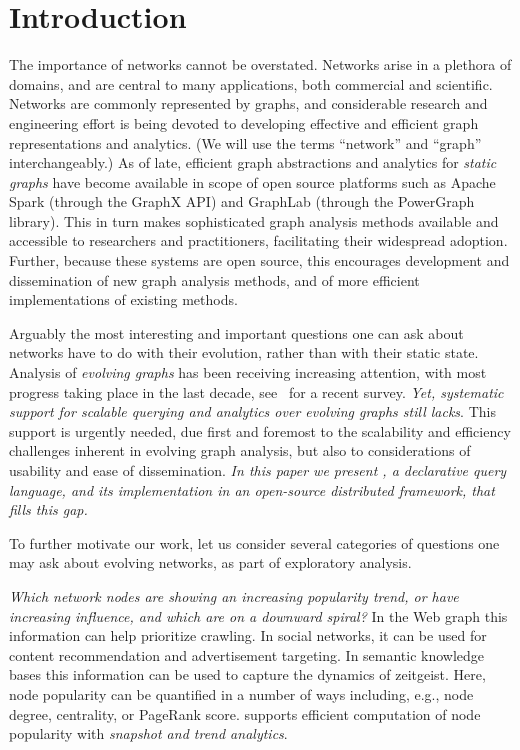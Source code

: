 \section{Introduction}
\label{sec:intro}

The importance of networks cannot be overstated. Networks arise in a
plethora of domains, and are central to many applications, both
commercial and scientific.  Networks are commonly represented by
graphs, and considerable research and engineering effort is being
devoted to developing effective and efficient graph representations
and analytics. (We will use the terms ``network'' and ``graph''
interchangeably.) As of late, efficient graph abstractions and
analytics for {\em static graphs} have become available in scope of
open source platforms such as Apache Spark (through the GraphX API)
and GraphLab (through the PowerGraph library).  This in turn makes
sophisticated graph analysis methods available and accessible to
researchers and practitioners, facilitating their widespread adoption.
Further, because these systems are open source, this encourages
development and dissemination of new graph analysis methods, and of
more efficient implementations of existing methods.

Arguably the most interesting and important questions one can ask
about networks have to do with their evolution, rather than with their
static state.  Analysis of {\em evolving graphs} has been receiving
increasing attention, with most progress taking place in the last
decade, see~\cite{DBLP:journals/csur/AggarwalS14} for a recent survey.
{\em Yet, systematic support for scalable querying and analytics over
  evolving graphs still lacks}.  This support is urgently needed, due
first and foremost to the scalability and efficiency challenges
inherent in evolving graph analysis, but also to considerations of
usability and ease of dissemination. {\em In this paper we present
  \ql, a declarative query language, and its implementation in an
  open-source distributed framework, that fills this gap.}

To further motivate our work, let us consider several categories of
questions one may ask about evolving networks, as part of exploratory
analysis.

{\em Which network nodes are showing an increasing popularity trend,
  or have increasing influence, and which are on a downward spiral?}
In the Web graph this information can help prioritize crawling.  In
social networks, it can be used for content recommendation and
advertisement targeting.  In semantic knowledge bases this information
can be used to capture the dynamics of zeitgeist.  Here, node
popularity can be quantified in a number of ways including, e.g., node
degree, centrality, or PageRank score.  \ql supports efficient
computation of node popularity with {\em snapshot and trend
  analytics}.

